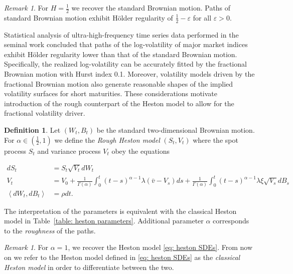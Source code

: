 \documentclass[12pt,twoside]{article}
\theoremstyle{plain}
\theoremstyle{plain}
\theoremstyle{definition}
\newtheorem{definition}[proposition]{Definition}
\theoremstyle{remark}
\newtheorem{remark}[proposition]{Remark}
\numberwithin{equation}{section}
\begin{document}
\begin{remark}
For $H=\frac 12$ we recover the standard Brownian motion. Paths of standard Brownian motion exhibit Hölder regularity of $\frac 12-\varepsilon$ for all $\varepsilon > 0$.
\end{remark}

Statistical analysis of ultra-high-frequency time series data performed in the seminal work \cite{GJR14} concluded that paths of the log-volatility of major market indices exhibit Hölder regularity lower than that of the standard Brownian motion. Specifically, the realized log-volatility can be accurately fitted by the fractional Brownian motion with Hurst index 0.1. Moreover, volatility models driven by the fractional Brownian motion also generate reasonable shapes of the implied volatility surfaces for short maturities. These considerations motivate introduction of the rough counterpart of the Heston model to allow for the fractional volatility driver. 

\begin{definition}

Let $(W_t, B_t)$ be the standard two-dimensional Brownian motion. For $\alpha \in \left(\frac 12, 1\right)$ we define the \emph{Rough Heston model} $(S_t, V_t)$ where the spot process $S_t$ and variance process $V_t$ obey the equations

\begin{equation}
\label{eq: rough heston model}
\begin{aligned}
d S_{t}&=S_{t} \sqrt{V_{t}} d W_{t} \\[5pt]
V_{t}&=V_{0}+\frac{1}{\Gamma(\alpha)} \int_{0}^{t}(t-s)^{\alpha-1} \lambda\left(\bar v-V_{s}\right) d s+\frac{1}{\Gamma(\alpha)} \int_{0}^{t}(t-s)^{\alpha-1} \lambda \xi \sqrt{V_{s}} d B_{s} \\[5pt]
\left\langle d W_{t}, d B_{t}\right\rangle&=\rho d t.
\end{aligned}
\end{equation}

The interpretation of the parameters is equivalent with the classical Heston model in Table~\ref{table: heston parameters}. Additional parameter $\alpha$ corresponds to the \emph{roughness} of the paths.

\end{definition}

\vspace{10pt}

\begin{remark}
For $\alpha = 1$, we recover the Heston model \eqref{eq: heston SDEs}. From now on we refer to the Heston model defined in \eqref{eq: heston SDEs} as the \emph{classical Heston model} in order to differentiate between the two.
\end{remark}
\end{document}
